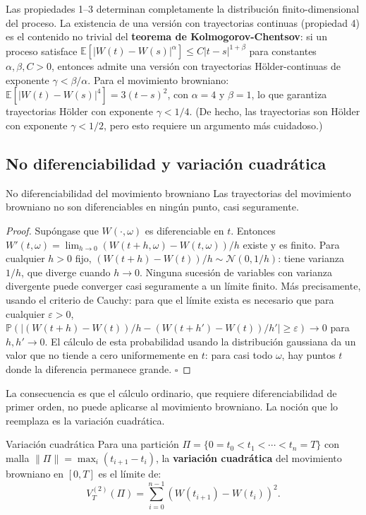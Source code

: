Las propiedades 1--3 determinan completamente la distribución finito-dimensional
del proceso. La existencia de una versión con trayectorias continuas (propiedad 4)
es el contenido no trivial del \textbf{teorema de Kolmogorov-Chentsov}: si un
proceso satisface $\mathbb{E}[|W(t)-W(s)|^\alpha] \leq C|t-s|^{1+\beta}$ para
constantes $\alpha, \beta, C > 0$, entonces admite una versión con trayectorias
Hölder-continuas de exponente $\gamma < \beta/\alpha$. Para el movimiento
browniano: $\mathbb{E}[|W(t)-W(s)|^4] = 3(t-s)^2$, con $\alpha = 4$ y $\beta = 1$,
lo que garantiza trayectorias Hölder con exponente $\gamma < 1/4$. (De hecho,
las trayectorias son Hölder con exponente $\gamma < 1/2$, pero esto requiere
un argumento más cuidadoso.)

\subsection{No diferenciabilidad y variación cuadrática}
\label{subsec:variacion_cuadratica}

\begin{proposicion}{No diferenciabilidad del movimiento browniano}
\label{prop:no_diff}
Las trayectorias del movimiento browniano no son diferenciables en ningún punto,
casi seguramente.
\end{proposicion}

\begin{proof}
Supóngase que $W(\cdot,\omega)$ es diferenciable en $t$. Entonces $W'(t,\omega) =
\lim_{h\to 0}(W(t+h,\omega)-W(t,\omega))/h$ existe y es finito. Para cualquier
$h > 0$ fijo, $(W(t+h)-W(t))/h \sim \mathcal{N}(0, 1/h)$: tiene varianza $1/h$,
que diverge cuando $h \to 0$. Ninguna sucesión de variables con varianza
divergente puede converger casi seguramente a un límite finito. Más precisamente,
usando el criterio de Cauchy: para que el límite exista es necesario que para
cualquier $\varepsilon > 0$, $\mathbb{P}(|(W(t+h)-W(t))/h - (W(t+h')-W(t))/h'|
\geq \varepsilon) \to 0$ para $h, h' \to 0$. El cálculo de esta probabilidad
usando la distribución gaussiana da un valor que no tiende a cero uniformemente
en $t$: para casi todo $\omega$, hay puntos $t$ donde la diferencia permanece
grande. $\square$
\end{proof}

La consecuencia es que el cálculo ordinario, que requiere diferenciabilidad de
primer orden, no puede aplicarse al movimiento browniano. La noción que lo
reemplaza es la variación cuadrática.

\begin{definicion}{Variación cuadrática}
\label{def:vc}
Para una partición $\Pi = \{0 = t_0 < t_1 < \cdots < t_n = T\}$ con malla
$\|\Pi\| = \max_i(t_{i+1}-t_i)$, la \textbf{variación cuadrática} del
movimiento browniano en $[0,T]$ es el límite de:
\[
  V_T^{(2)}(\Pi) = \sum_{i=0}^{n-1}(W(t_{i+1})-W(t_i))^2.
\]
\end{definicion}

